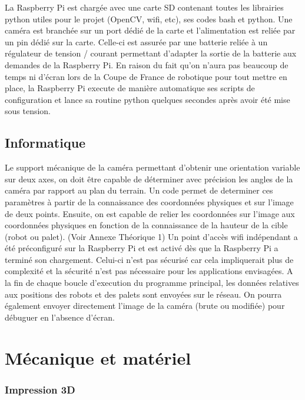 \documentclass{article}
\begin{document}
La Raspberry Pi est chargée avec une carte SD contenant toutes les librairies python utiles pour le projet (OpenCV, wifi, etc), ses codes bash et python.
Une caméra est branchée sur un port dédié de la carte et l'alimentation est reliée par un pin dédié sur la carte. Celle-ci est assurée par une batterie reliée à un régulateur de tension / courant permettant d'adapter la sortie de la batterie aux demandes de la Raspberry Pi.
En raison du fait qu'on n'aura pas beaucoup de temps ni d'écran lors de la Coupe de France de robotique pour tout mettre en place, la Raspberry Pi execute de manière automatique ses scripts de configuration et lance sa routine python quelques secondes après avoir été mise sous tension.
\newline\newline
\chapter{\bf \LARGE{Informatique}}

Le support mécanique de la caméra permettant d'obtenir une orientation variable sur deux axes, on doit être capable de déterminer avec précision les angles de la caméra par rapport au plan du terrain. Un code permet de determiner ces paramètres à partir de la connaissance des coordonnées physiques et sur l'image de deux points.
Ensuite, on est capable de relier les coordonnées sur l'image aux coordonnées physiques en fonction de la connaissance de la hauteur de la cible (robot ou palet). (Voir Annexe Théorique 1)
\newline\newline
Un point d'accès wifi indépendant a été préconfiguré sur la Raspberry Pi et est activé dès que la Raspberry Pi a terminé son chargement. Celui-ci n'est pas sécurisé car cela impliquerait plus de complexité et la sécurité n'est pas nécessaire pour les applications envisagées.
A la fin de chaque boucle d'execution du programme principal, les données relatives aux positions des robots et des palets sont envoyées sur le réseau. On pourra également envoyer directement l'image de la caméra (brute ou modifiée) pour débuguer en l'absence d'écran.

\newpage
\part{Mécanique et matériel}
\section{Impression 3D}
\end{document}
